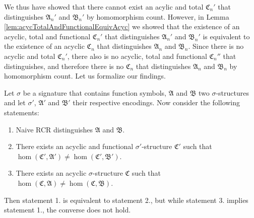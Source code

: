 We thus have showed that there cannot exist an acylic and total $\mathfrak C_n'$ that distinguishes $\mathfrak A_n'$ and $\mathfrak B_n'$ by homomorphism count.
However, in Lemma \ref{lem:acycTotalAndFunctionalEquivAcyc} we showed that the existence of an acyclic, total and functional $\mathfrak C_n'$ that distinguishes $\mathfrak A_n'$ and $\mathfrak B_n'$ is equivalent to the existence of an acyclic $\mathfrak C_n$ that distinguishes $\mathfrak A_n$ and $\mathfrak B_n$.
Since there is no acyclic and total $\mathfrak C_n'$, there also is no acyclic, total and functional $\mathfrak C_n''$ that distinguishes, and therefore there is no $\mathfrak C_n$ that distinguishes $\mathfrak A_n$ and $\mathfrak B_n$ by homomorphism count.
Let us formalize our findings.

\begin{theorem}
	Let $\sigma$ be a signature that contains function symbols, $\mathfrak A$ and $\mathfrak B$ two $\sigma$-structures and let $\sigma'$, $\mathfrak A'$ and $\mathfrak B'$ their respective encodings.
	Now consider the following statements:
	\begin{enumerate}
		\item Naive RCR distinguishes $\mathfrak A$ and $\mathfrak B$.
		\item There exists an acyclic and functional $\sigma'$-structure $\mathfrak C'$ such that $\hom(\mathfrak C',\mathfrak A')\neq\hom(\mathfrak C',\mathfrak B')$.
		\item There exists an acyclic $\sigma$-structure $\mathfrak C$ such that $\hom(\mathfrak C,\mathfrak A)\neq \hom(\mathfrak C,\mathfrak B)$.
	\end{enumerate}
	Then statement 1. is equivalent to statement 2., but while statement 3. implies statement 1., the converse does not hold.
	\label{thm:nRCRNotCharacByHomCount}
\end{theorem}
